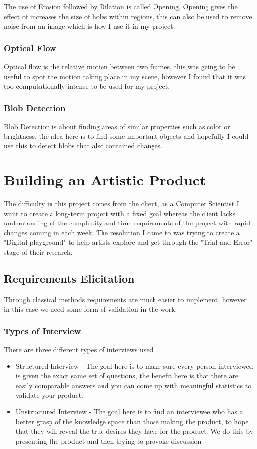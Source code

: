 \documentclass[a4paper]{report}
\begin{document}
The use of Erosion followed by Dilation is called Opening, Opening gives the effect of increases the size of holes within regions, this can also be used to remove noise from an image which is how I use it in my project.

\subsection{Optical Flow}
Optical flow is the relative motion between two frames, this was going to be useful to spot the motion taking place in my scene, however I found that it was too computationally intense to be used for my project.

\subsection{Blob Detection}
Blob Detection is about finding areas of similar properties such as color or brightness, the idea here is to find some important objects and hopefully I could use this to detect blobs that also contained changes.

\chapter{Building an Artistic Product}
The difficulty in this project comes from the client, as a Computer Scientist I want to create a long-term project with a fixed goal whereas the client lacks understanding of the complexity and time requirements of the project with rapid changes coming in each week. The resolution I came to was trying to create a "Digital playground" to help artists explore and get through the "Trial and Error" stage of their research.

\section{Requirements Elicitation}
Through classical methods requirements are much easier to implement, however in this case we need some form of validation in the work.

\subsection{Types of Interview}
There are three different types of interviews used.

\begin{itemize}
\item Structured Interview - The goal here is to make sure every person interviewed is given the exact same set of questions, the benefit here is that there are easily comparable answers and you can come up with meaningful statistics to validate your product.

\item Unstructured Interview - The goal here is to find an interviewee who has a better grasp of the knowledge space than those making the product, to hope that they will reveal the true desires they have for the product. We do this by presenting the product and then trying to provoke discussion
\end{itemize}
\end{document}

